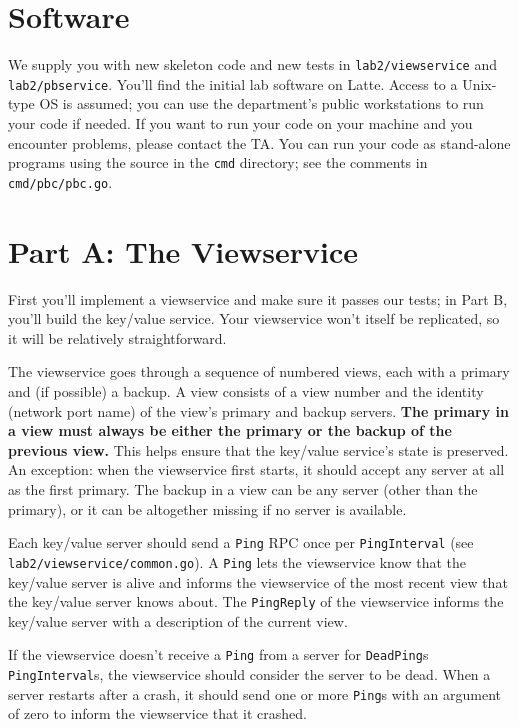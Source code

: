 \documentclass{article}
\newcommand{\code}{\texttt}
\begin{document}
\section{Software}
We supply you with new skeleton code and new tests in \code{lab2/viewservice} and \code{lab2/pbservice}. You'll find the initial lab software on Latte. Access to a Unix-type OS is assumed; you can use the department's public workstations to run your code if needed. If you want to run your code on your machine and you encounter problems, please contact the TA. You can run your code as stand-alone programs using the source in the \code{cmd} directory; see the comments in \code{cmd/pbc/pbc.go}. 

\section{Part A: The Viewservice}
First you'll implement a viewservice and make sure it passes our tests; in Part B, you'll build the key/value service. Your viewservice won't itself be replicated, so it will be relatively straightforward. 

The viewservice goes through a sequence of numbered views, each with a primary and (if possible) a backup. A view consists of a view number and the identity (network port name) of the view's primary and backup servers. \textbf{The primary in a view must always be either the primary or the backup of the previous view.} This helps ensure that the key/value service's state is preserved. An exception: when the viewservice first starts, it should accept any server at all as the first primary. The backup in a view can be any server (other than the primary), or it can be altogether missing if no server is available. 

Each key/value server should send a \code{Ping} RPC once per \code{PingInterval} (see \code{lab2/viewservice/common.go}). A \code{Ping} lets the viewservice know that the key/value server is alive and informs the viewservice of the most recent view that the key/value server knows about. The \code{PingReply} of the viewservice informs the key/value server with a description of the current view.

If the viewservice doesn't receive a \code{Ping} from a server for \code{DeadPing}s \code{PingInterval}s, the viewservice should consider the server to be dead. When a server restarts after a crash, it should send one or more \code{Ping}s with an argument of zero to inform the viewservice that it crashed. 
\end{document}
